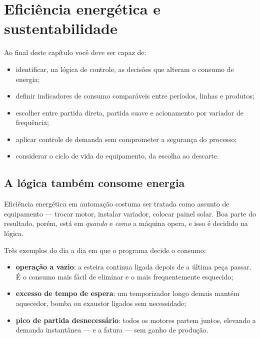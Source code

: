 \chapter{Eficiência energética e sustentabilidade}
\label{cap:eficiencia}

\begin{objetivos}
Ao final deste capítulo você deve ser capaz de:
\begin{itemize}
  \item identificar, na lógica de controle, as decisões que alteram o consumo de energia;
  \item definir indicadores de consumo comparáveis entre períodos, linhas e produtos;
  \item escolher entre partida direta, partida suave e acionamento por variador de frequência;
  \item aplicar controle de demanda sem comprometer a segurança do processo;
  \item considerar o ciclo de vida do equipamento, da escolha ao descarte.
\end{itemize}
\end{objetivos}

\section{A lógica também consome energia}

Eficiência energética em automação costuma ser tratada como assunto de equipamento --- trocar motor,
instalar variador, colocar painel solar. Boa parte do resultado, porém, está em \emph{quando} e
\emph{como} a máquina opera, e isso é decidido na lógica.

Três exemplos do dia a dia em que o programa decide o consumo:

\begin{itemize}
  \item \textbf{operação a vazio}: a esteira continua ligada depois de a última peça passar. É o
        consumo mais fácil de eliminar e o mais frequentemente esquecido;
  \item \textbf{excesso de tempo de espera}: um temporizador longo demais mantém aquecedor, bomba ou
        exaustor ligados sem necessidade;
  \item \textbf{pico de partida desnecessário}: todos os motores partem juntos, elevando a demanda
        instantânea --- e a fatura --- sem ganho de produção.
\end{itemize}


